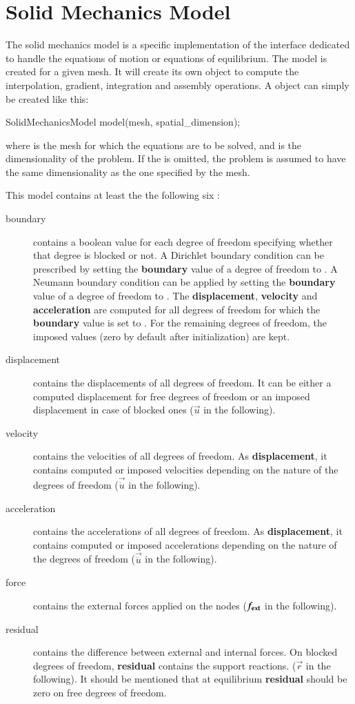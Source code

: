 \chapter{Solid Mechanics
Model\label{sect:smm}}

The solid mechanics model is a specific implementation of the
 interface dedicated to handle the equations of motion or
equations of equilibrium. The model is created for a given mesh.  It
will create its own  object to compute the interpolation,
gradient, integration and assembly operations.  A
 object can simply be created like this:
\begin{cpp} SolidMechanicsModel model(mesh, spatial_dimension);
\end{cpp} where  is the mesh for which the equations are to
be solved, and  is the dimensionality of the
problem.  If the  is omitted, the problem is
assumed to have the same dimensionality as the one specified by the
mesh.

This model contains at least the the following six :
\begin{description}
\item[boundary] contains a boolean value for each degree of freedom
specifying whether that degree is blocked or not. A Dirichlet boundary
condition can be prescribed by setting the \textbf{boundary} value of
a degree of freedom to .  A Neumann boundary condition can
be applied by setting the \textbf{boundary} value of a degree of
freedom to .  The \textbf{displacement}, \textbf{velocity}
and \textbf{acceleration} are computed for all degrees of freedom for
which the \textbf{boundary} value is set to . For the
remaining degrees of freedom, the imposed values (zero by default
after initialization) are kept.
\item[displacement] contains the displacements of all degrees of
freedom. It can be either a computed displacement for free degrees of
freedom or an imposed displacement in case of blocked ones ($\vec{u}$
in the following).
\item[velocity] contains the velocities of all degrees of freedom.  As
\textbf{displacement}, it contains computed or imposed velocities
depending on the nature of the degrees of freedom ($\vec{\dot{u}}$ in
the following).
\item[acceleration] contains the accelerations of all degrees of
freedom. As \textbf{displacement}, it contains computed or imposed
accelerations depending on the nature of the degrees of freedom
($\vec{\ddot{u}}$ in the following).
\item[force] contains the external forces applied on the nodes
($\boldsymbol{f_{{\mathrm{ext}}}}$ in the following).
\item[residual] contains the difference between external and internal
forces. On blocked degrees of freedom, \textbf{residual} contains the
support reactions.  ($\vec{r}$ in the following).  It should be
mentioned that at equilibrium \textbf{residual} should be zero on free
degrees of freedom.
\end{description}

